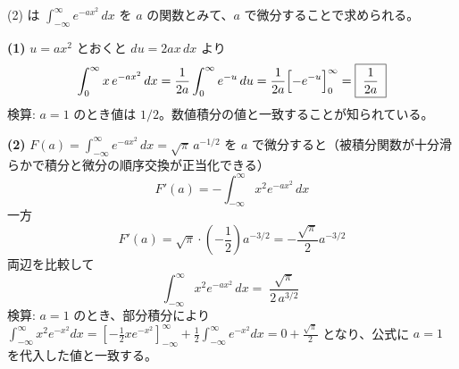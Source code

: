 
(2) は $\displaystyle\int_{-\infty}^{\infty} e^{-a x^{2}}\, dx$ を $a$ の関数とみて、$a$ で微分することで求められる。

\textbf{(1)} $u = a x^{2}$ とおくと $du = 2ax\, dx$ より
\[
\int_{0}^{\infty} x\, e^{-a x^{2}}\, dx = \frac{1}{2a}\int_{0}^{\infty} e^{-u}\, du = \frac{1}{2a}\Bigl[-e^{-u}\Bigr]_{0}^{\infty} = \boxed{\; \frac{1}{2a} \;}
\]
検算: $a=1$ のとき値は $1/2$。数値積分の値と一致することが知られている。

\smallskip
\textbf{(2)} $\displaystyle F(a) = \int_{-\infty}^{\infty} e^{-a x^{2}}\, dx = \sqrt{\pi}\, a^{-1/2}$ を $a$ で微分すると（被積分関数が十分滑らかで積分と微分の順序交換が正当化できる）
\[
F'(a) = -\int_{-\infty}^{\infty} x^{2} e^{-a x^{2}}\, dx
\]
一方
\[
F'(a) = \sqrt{\pi} \cdot \left(-\frac{1}{2}\right) a^{-3/2} = -\frac{\sqrt{\pi}}{2}a^{-3/2}
\]
両辺を比較して
\[
\int_{-\infty}^{\infty} x^{2} e^{-a x^{2}}\, dx = \boxed{\; \frac{\sqrt{\pi}}{2\, a^{3/2}} \;}
\]
検算: $a=1$ のとき、部分積分により $\displaystyle\int_{-\infty}^{\infty} x^{2}e^{-x^{2}}dx = \left[-\frac{1}{2}x e^{-x^{2}}\right]_{-\infty}^{\infty} + \frac{1}{2}\int_{-\infty}^{\infty} e^{-x^{2}}dx = 0 + \frac{\sqrt{\pi}}{2}$ となり、公式に $a=1$ を代入した値と一致する。
